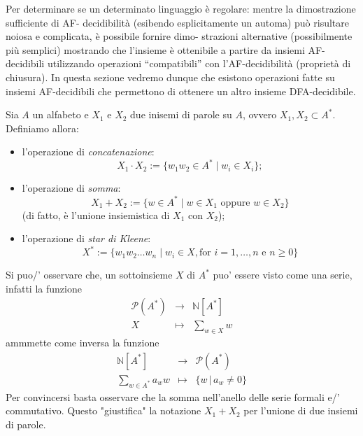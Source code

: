 Per determinare se un determinato linguaggio è regolare: mentre la dimostrazione suﬀiciente di AF-
decidibilità (esibendo esplicitamente un automa) può risultare noiosa e complicata, è possibile fornire dimo-
strazioni alternative (possibilmente più semplici) mostrando che l’insieme è ottenibile a partire da insiemi
AF-decidibili utilizzando operazioni “compatibili” con l’AF-decidibilità (proprietà di chiusura).
In questa sezione vedremo dunque che esistono operazioni fatte su insiemi AF-decidibili che permettono
di ottenere un altro insieme DFA-decidibile.
\begin{defi}
    Sia $A$ un alfabeto e $X_1$ e $X_2$ due inisemi di parole su $A$, ovvero $X_1,X_2 \subset A^*$. Definiamo allora:
    \begin{itemize}
    \item l'operazione di \emph{concatenazione}:
    \[
    X_1 \cdot X_2 := \{ w_1 w_2 \in A^* \mid w_i \in X_i \};
    \]

    \item l'operazione di \emph{somma}:
    \[
    X_1 + X_2 := \{ w \in A^* \mid w \in X_1 \text{ oppure } w \in X_2 \}
    \]
    (di fatto, è l'unione insiemistica di $X_1$ con $X_2$);

    \item l'operazione di \emph{star di Kleene}:
    \[
    X^* := \{ w_1 w_2 \dots w_n \mid w_i \in X, \text{for } i=1,\dots,n \text{ e } n\geq 0 \}
    \]
\end{itemize}

\end{defi}

\begin{rema}
    Si puo/' osservare che, un sottoinsieme $X$ di $A^*$
    puo' essere visto come una serie, infatti la funzione
    \[
    \begin{matrix}
    \mathcal P (A^*) & \to & \mathbb N[A^*]
    \\
    X & \mapsto & \sum_{w\in X} w 
    \end{matrix}
    \]
    ammmette come inversa la funzione
    \[
    \begin{matrix}
     \mathbb N[A^*] & \to &  \mathcal P (A^*) 
    \\
    \sum_{w\in A^*} a_w w & \mapsto  & \{ w \, | \, a_w \neq 0 \}
    \end{matrix}
    \]
    Per convincersi basta osservare che la somma nell'anello delle serie formali e/' commutativo.
Questo "giustifica" la notazione $X_1 + X_2$ per l'unione di due insiemi di parole.
\end{rema}

